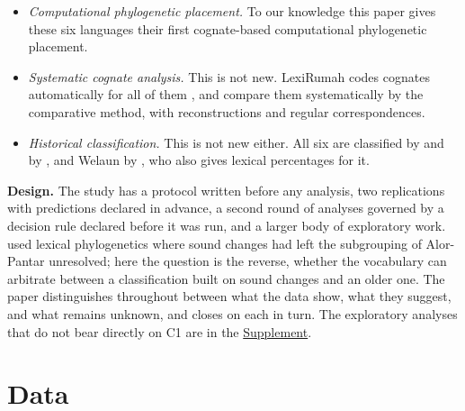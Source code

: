 \documentclass[11pt]{article}
\begin{document}
\begin{itemize}
\item \emph{Computational phylogenetic placement.} To our knowledge this paper gives these six languages their first cognate-based computational phylogenetic placement.
\item \emph{Systematic cognate analysis.} This is not new. LexiRumah codes cognates automatically for all of them \citep{kaiping2019}, and \citet{grimes2026} compare them systematically by the comparative method, with reconstructions and regular correspondences.
\item \emph{Historical classification.} This is not new either. All six are classified by \citet{hull1998,hull2001a} and by \citet{grimes2026}, and Welaun by \citet{edwards2019}, who also gives lexical percentages for it.
\end{itemize}

\textbf{Design.} The study has a protocol written before any analysis, two replications with predictions declared in advance, a second round of analyses governed by a decision rule declared before it was run, and a larger body of exploratory work. \citet{robinson2012} used lexical phylogenetics where sound changes had left the subgrouping of Alor-Pantar unresolved; here the question is the reverse, whether the vocabulary can arbitrate between a classification built on sound changes and an older one. The paper distinguishes throughout between what the data show, what they suggest, and what remains unknown, and closes on each in turn. The exploratory analyses that do not bear directly on C1 are in the \hyperref[supplement]{Supplement}.

\section{Data}
\end{document}
